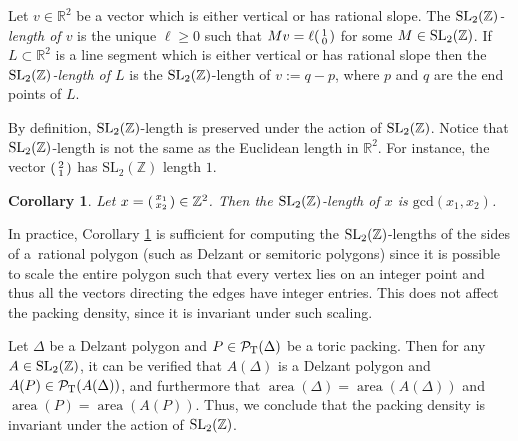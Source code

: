 \documentclass[pdftex]{sigma}
\numberwithin{equation}{section}
\newtheorem{Corollary}[Theorem]{Corollary}
\newenvironment{psmallmatrix}
 {\left(\begin{smallmatrix}}
 {\end{smallmatrix}\right)}
\def\R{{\mathbb R}}
\def\Z{{\mathbb Z}}
\newcommand{\De}{\Delta}
\newcommand{\area}{\operatorname{area}}
\newcommand{\PT}{\mathcal{P}_{\rm T}}
\newcommand{\SL}{{\rm SL}_2(\Z)}
\newcommand{\vect}[2]{\begin{psmallmatrix} #1 \\ #2 \end{psmallmatrix}}
\begin{document}
\begin{Definition}\label{def:sl2z-length} Let $v\in\R^2$ be a vector which is either vertical or has rational slope.
The \emph{$\SL$-length of $v$} is the unique $\ell\geq 0$
such that $Mv = \ell \vect{1}{0}$
for some $M\in\SL$.
If $L\subset \R^2$ is a line segment which is either vertical or has rational slope then the \emph{$\SL$-length of $L$} is the $\SL$-length of $v := q-p$, where $p$ and $q$ are the end points of $L$.
\end{Definition}

By definition, $\SL$-length is preserved under the action of $\SL$.
Notice that $\SL$-length is not the same as the Euclidean length in $\R^2$.
For instance, the vector $\begin{psmallmatrix} 2 \\ 1 \end{psmallmatrix}$ has $\mathrm{SL}_2(\mathbb{Z})$ length $1$.

\begin{Corollary} \label{cor:SL_gcd}
Let $ x = \vect{x_1}{x_2} \in \mathbb{Z}^2$. Then the $\SL$-length of $x$ is $\mathrm{gcd}(x_1, x_2)$.
\end{Corollary}



In practice, Corollary \ref{cor:SL_gcd} is sufficient for computing the $\SL$-lengths of the sides of a~rational polygon (such as Delzant or semitoric polygons) since it is possible to scale the entire polygon such that every vertex lies on an integer point and thus all the vectors directing the edges have integer entries. This does not affect the packing density, since it is invariant under such scaling.

\begin{Remark}
 Let $\De$ be a Delzant polygon and $P\in \PT(\De)$ be a toric packing.
 Then for any $A\in\SL$, it can be verified that $A(\De)$ is a Delzant polygon and $A(P)\in\PT(A(\De))$, and furthermore that $\area(\De) = \area(A(\De))$
 and $\area(P) = \area(A(P))$. Thus, we conclude that the packing density is invariant under the action of $\SL$.
\end{Remark}
\end{document}
